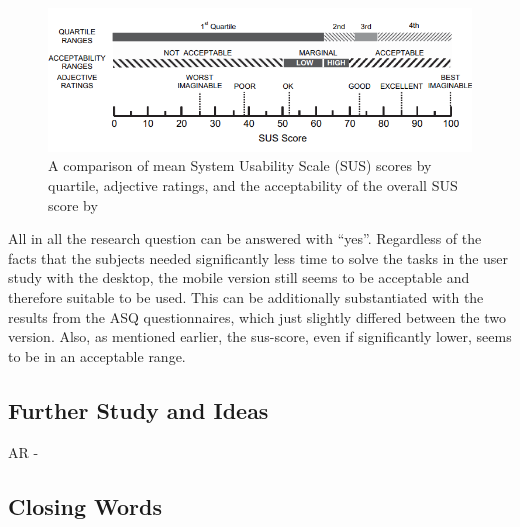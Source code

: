 \begin{figure}[htb]
    \centering
    \includegraphics[width=1\textwidth]{Conclusion/img/sus.png}
    \caption{A comparison of mean System Usability Scale (SUS) scores by quartile,
    adjective ratings, and the acceptability of the overall SUS score by \cite{doi:10.1080/10447310802205776}}\label{fig:sus_scale}
  \end{figure}

  All in all the research question can be answered with \enquote{yes}.
  Regardless of the facts that the subjects needed significantly less time to solve the tasks in the user study with the desktop, the mobile version still seems to be acceptable and therefore suitable to be used.
  This can be additionally substantiated with the results from the \gls{ASQ} questionnaires, which just slightly differed between the two version.
  Also, as mentioned earlier, the \gls{sus}-score, even if significantly lower, seems to be in an acceptable range.

\subsection{Further Study and Ideas}
AR - \cite{santos2016guidelines}

\subsection{Closing Words}